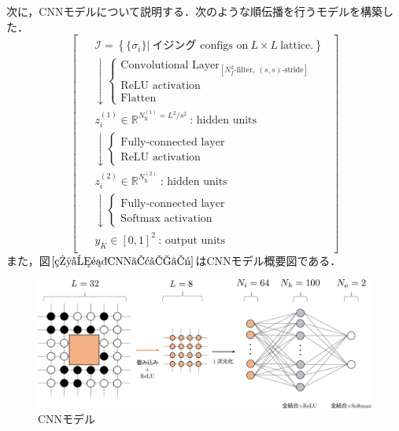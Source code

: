 \documentclass[a4paper,11pt]{jsreport}
\begin{document}
次に，CNNモデルについて説明する．次のような順伝播を行うモデルを構築した．
\begin{equation}
  \begin{bmatrix}
    \begin{aligned}
       & \mathcal{I} = \left\{ \{ \sigma_i \} \Big| \ \text{イジング configs on} \ L \times L \ \text{lattice.} \right\} \\
       & \downarrow
      \begin{cases}
        \text{Convolutional Layer}_{[N_f^2\text{-filter}, \ (s,s)\text{-stride}]} \\
        \text{ReLU activation} \\
        \text{Flatten}
      \end{cases} \\
       & z_i^{(1)} \in \mathbb{R}^{N_{\text{h}}^{(1)} = L^2/s^2} \ \text{: hidden units} \\
       & \downarrow
      \begin{cases}
        \text{Fully-connected layer} \\
        \text{ReLU activation}
      \end{cases} \\
       & z_i^{(2)} \in \mathbb{R}^{N_{\text{h}}^{(2)}} \ \text{: hidden units} \\
       & \downarrow
      \begin{cases}
        \text{Fully-connected layer} \\
        \text{Softmax activation}
      \end{cases} \\
       & y_K \in [0,1]^{2} \ \text{: output units}
    \end{aligned}
  \end{bmatrix}
\end{equation}
また，図$\ref{相分類CNNモデル}$はCNNモデル概要図である．

\begin{figure}[H]
   \begin{center}
       \includegraphics[width=\linewidth]{image/相分類CNNモデル.png}
       \caption{CNNモデル}
       \label{相分類CNNモデル}
   \end{center}
\end{figure}
\end{document}
